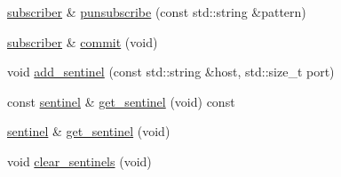 \begin{DoxyCompactItemize}
\item 
\hyperlink{classcpp__redis_1_1subscriber}{subscriber} \& \hyperlink{classcpp__redis_1_1subscriber_a26edc7dcf87ddc8734fac04878ca307a}{punsubscribe} (const std\+::string \&pattern)
\item 
\hyperlink{classcpp__redis_1_1subscriber}{subscriber} \& \hyperlink{classcpp__redis_1_1subscriber_abbf600802ed93b82323185eec5719ecb}{commit} (void)
\item 
void \hyperlink{classcpp__redis_1_1subscriber_a10584e201abe4e701b70d078b3a676fc}{add\+\_\+sentinel} (const std\+::string \&host, std\+::size\+\_\+t port)
\item 
const \hyperlink{classcpp__redis_1_1sentinel}{sentinel} \& \hyperlink{classcpp__redis_1_1subscriber_a55a8906106adceca1faf6ab26e040f8a}{get\+\_\+sentinel} (void) const
\item 
\hyperlink{classcpp__redis_1_1sentinel}{sentinel} \& \hyperlink{classcpp__redis_1_1subscriber_ae883ef7e41753d5c1d819260d7574e4b}{get\+\_\+sentinel} (void)
\item 
void \hyperlink{classcpp__redis_1_1subscriber_ac8f371c14866842cdda7cf1ee5eee2b8}{clear\+\_\+sentinels} (void)
\end{DoxyCompactItemize}
